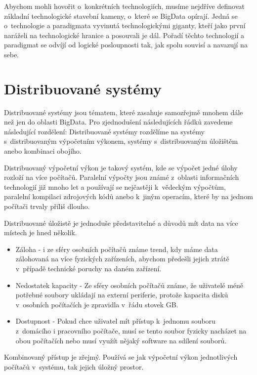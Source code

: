 
Abychom mohli hovořit o~konkrétních technologiích, musíme nejdříve definovat základní technologické stavební kameny, o~které se BigData opírají. Jedná se o~technologie a paradigmata vyvinutá technologickými giganty, kteří jako první naráželi na technologické hranice a posouvali je dál. Pořadí těchto technologií a paradigmat se odvíjí od logické posloupnosti tak, jak spolu souvisí a navazují na sebe.    

\section{Distribuované systémy}
Distribuované systémy jsou tématem, které zasahuje samozřejmě mnohem dále než jen do oblasti BigData. Pro zjednodušení následujících řádků zavedeme následující rozdělení: Distribuované systémy rozdělíme na systémy s~distribuovaným výpočetním výkonem, systémy s~distribuovaným úložištěm anebo kombinaci obojího. 

Distribuovaný výpočetní výkon je takový systém, kde se výpočet jedné úlohy rozloží na více počítačů. Paralelní výpočty jsou známé z~oblasti informačních technologií již mnoho let a používají se nejčastěji k~vědeckým výpočtům, paralelní kompilaci zdrojových kódů anebo k~jiným operacím, které by na jednom počítači trvaly příliš dlouho. 

Distribuované úložistě je jednoduše představitelné a důvodů mít data na více místech je hned několik.
\begin{itemize}
\item Záloha - i ze sféry osobních počítačů známe trend, kdy máme data zálohovaná na více fyzických zařízeních, abychom předešli jejich ztrátě v~případě technické poruchy na daném zařízení. 

\item Nedostatek kapacity - Ze sféry osobních počítačů známe, že uživatelé méně potřebné soubory ukládají na externí periferie, protože kapacita disků v~osobních počítačích je zpravidla v~řádu stovek GB.

\item Dostupnost - Pokud chce uživatel mít přístup k~jednomu souboru z~domácího i pracovního počítače, musí se tento soubor fyzicky nacházet na obou počítačích nebo musí využít nějaký software na sdílení souborů. 

\end{itemize}

Kombinovaný přístup je zřejmý. Používá se jak výpočetní výkon jednotlivých počítačů v~systému, tak jejich úložný prostor. 

